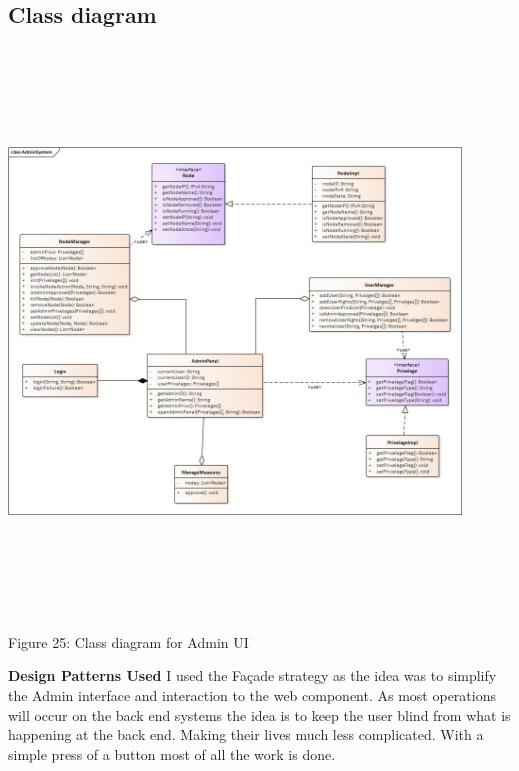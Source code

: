 \subsection{Class diagram}
 \includegraphics[width=12cm,height=15cm,keepaspectratio]{admin_ui/images/AdminSystem.jpg}
	\begin{center}
	    \small{Figure 25: Class diagram for Admin UI}
    \end{center}
    \par \textbf{Design Patterns Used}
    I used the Façade strategy as the idea was to simplify the Admin interface and interaction to the web component. As most operations will occur on the back end systems the idea is to keep the user blind from what is happening at the back end. Making their lives much less complicated. With a simple press of a button most of all the work is done. \newline \newline
	
	
		
